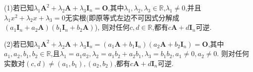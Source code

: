 \documentclass[../../main.tex]{subfiles}%
\begin{document}
\begin{proposition}\label{proposition:由矩阵的零化多项式构造其逆矩阵}
(1)若已知\(\lambda_1\boldsymbol{A}^2+\lambda_2\boldsymbol{A}+\lambda_3\boldsymbol{I}_n=\boldsymbol{O}\),其中\(\lambda_1,\lambda_2,\lambda_3\in\mathbb{R}\),$\lambda_1\ne 0$,并且$\lambda_1x^2+\lambda_2x+\lambda_3=0$无实根(即原等式左边不可因式分解成$\left( a_1\boldsymbol{I}_n+a_2\boldsymbol{A} \right) \left( b_1\boldsymbol{I}_n+b_2\boldsymbol{A} \right)$),
则对任何$c,d\in\mathbb{R}$,都有\(c\boldsymbol{A}+d\boldsymbol{I}_n\)可逆.

(2)若已知\(\lambda_1\boldsymbol{A}^2+\lambda_2\boldsymbol{A}+\lambda_3\boldsymbol{I}_n=(a_1\boldsymbol{A}+b_1\boldsymbol{I}_n)(a_2\boldsymbol{A}+b_2\boldsymbol{I}_n)=\boldsymbol{O}\),其中\(a_1,a_2,b_1,b_2\in\mathbb{R}\),且\(\lambda_1=a_1a_2,\lambda_2=a_1b_2+a_2b_1,\lambda_3=b_1b_2,a_1\ne 0,a_2\ne 0\).
则对任何实数对\(\left( c,d \right) \ne \left( a_1,b_1 \right) ,\left( a_2,b_2 \right)\),都有\(c\boldsymbol{A}+d\boldsymbol{I}_n\)可逆.
\end{proposition}
\end{document}
